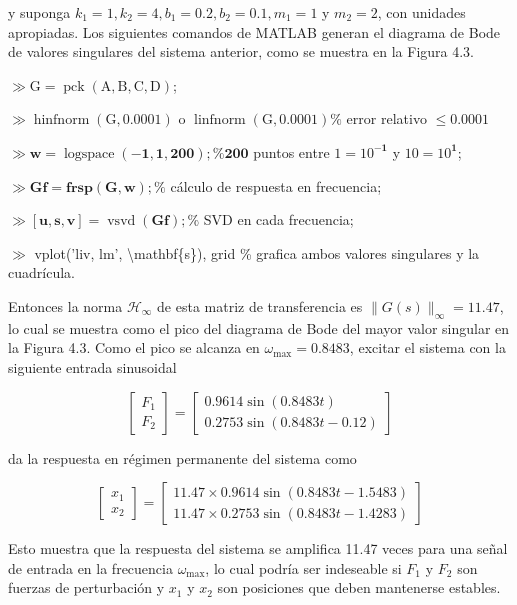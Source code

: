 y suponga $k_{1}=1, k_{2}=4, b_{1}=0.2, b_{2}=0.1, m_{1}=1$ y $m_{2}=2$, con unidades apropiadas. Los siguientes comandos de MATLAB generan el diagrama de Bode de valores singulares del sistema anterior, como se muestra en la Figura 4.3.

$\gg \mathrm{G}=\operatorname{pck}(\mathrm{A}, \mathrm{B}, \mathrm{C}, \mathrm{D})$;

$\gg \operatorname{hinfnorm}(\mathrm{G}, \mathbf{0.0001})$ o $\operatorname{linfnorm}(\mathrm{G}, \mathbf{0.0001}) \%$ error relativo $\leq 0.0001$

$\gg \mathbf{w}=\operatorname{logspace}(-\mathbf{1}, \mathbf{1}, \mathbf{200}) ; \% \mathbf{200}$ puntos entre $1=10^{-\mathbf{1}}$ y $10=10^{\mathbf{1}}$;

$\gg \mathbf{Gf}=\mathbf{frsp}(\mathbf{G}, \mathbf{w}) ; \%$ cálculo de respuesta en frecuencia;

$\gg[\mathbf{u}, \mathbf{s}, \mathbf{v}]=\operatorname{vsvd}(\mathbf{Gf}) ; \%$ SVD en cada frecuencia;

$\gg$ vplot('liv, lm', \textbackslash mathbf\{s\}), grid \% grafica ambos valores singulares y la cuadrícula.

Entonces la norma $\mathcal{H}_{\infty}$ de esta matriz de transferencia es $\|G(s)\|_{\infty}=11.47$, lo cual se muestra como el pico del diagrama de Bode del mayor valor singular en la Figura 4.3. Como el pico se alcanza en $\omega_{\max }=0.8483$, excitar el sistema con la siguiente entrada sinusoidal

$$
\left[\begin{array}{l}
F_{1} \\
F_{2}
\end{array}\right]=\left[\begin{array}{l}
0.9614 \sin (0.8483 t) \\
0.2753 \sin (0.8483 t-0.12)
\end{array}\right]
$$

da la respuesta en régimen permanente del sistema como

$$
\left[\begin{array}{l}
x_{1} \\
x_{2}
\end{array}\right]=\left[\begin{array}{l}
11.47 \times 0.9614 \sin (0.8483 t-1.5483) \\
11.47 \times 0.2753 \sin (0.8483 t-1.4283)
\end{array}\right]
$$

Esto muestra que la respuesta del sistema se amplifica 11.47 veces para una señal de entrada en la frecuencia $\omega_{\max }$, lo cual podría ser indeseable si $F_{1}$ y $F_{2}$ son fuerzas de perturbación y $x_{1}$ y $x_{2}$ son posiciones que deben mantenerse estables.

